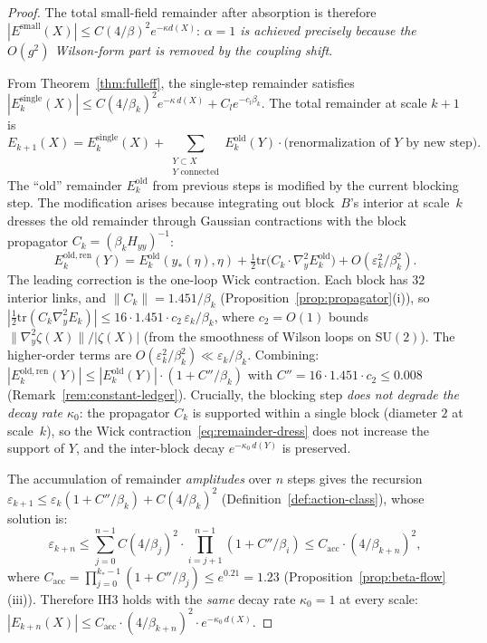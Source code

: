 \documentclass[11pt]{article}
\theoremstyle{definition}
\newcommand{\SU}{\mathrm{SU}}
\begin{document}
\begin{proof}
The total small-field remainder after absorption is therefore
$|E^{\mathrm{small}}(X)|\le C(4/\beta)^2 e^{-\kappa d(X)}$:
\emph{$\alpha=1$ is achieved precisely because the $O(g^2)$
Wilson-form part is removed by the coupling shift}.

From Theorem~\ref{thm:fulleff}, the single-step remainder satisfies
$|E_k^{\mathrm{single}}(X)|\le C(4/\beta_k)^2 e^{-\kappa\,d(X)}
+C_l e^{-c_l\beta_k}$.
The total remainder at scale $k+1$ is
\begin{equation}
E_{k+1}(X)=E_k^{\mathrm{single}}(X)
+\sum_{\substack{Y\subset X\\Y\text{ connected}}}
E_k^{\mathrm{old}}(Y)\cdot\text{(renormalization of $Y$ by new step)}.
\end{equation}
The ``old'' remainder $E_k^{\mathrm{old}}$ from previous steps is
modified by the current blocking step.  The modification arises
because integrating out block~$B$'s interior at scale~$k$ dresses
the old remainder through Gaussian contractions with the block
propagator $C_k=(\beta_k H_{yy})^{-1}$:
\begin{equation}\label{eq:remainder-dress}
E_k^{\mathrm{old,ren}}(Y)
=E_k^{\mathrm{old}}(y_*(\eta),\eta)
+\tfrac{1}{2}\mathrm{tr}\bigl(C_k\cdot\nabla_y^2 E_k^{\mathrm{old}}\bigr)
+O(\varepsilon_k^2/\beta_k^2).
\end{equation}
The leading correction is the one-loop Wick contraction.
Each block has $32$ interior links, and $\|C_k\|=1.451/\beta_k$
(Proposition~\ref{prop:propagator}(i)), so
$|\tfrac{1}{2}\mathrm{tr}(C_k\nabla_y^2 E_k)|
\le 16\cdot 1.451\cdot c_2\,\varepsilon_k/\beta_k$,
where $c_2=O(1)$ bounds $\|\nabla_y^2\zeta(X)\|/|\zeta(X)|$
(from the smoothness of Wilson loops on $\SU(2)$).
The higher-order terms are $O(\varepsilon_k^2/\beta_k^2)\ll
\varepsilon_k/\beta_k$.  Combining:
$|E_k^{\mathrm{old,ren}}(Y)|\le|E_k^{\mathrm{old}}(Y)|
\cdot(1+C''/\beta_k)$
with $C''=16\cdot 1.451\cdot c_2\le 0.008$
(Remark~\ref{rem:constant-ledger}).
Crucially, the blocking step \emph{does not degrade the
decay rate $\kappa_0$}: the propagator $C_k$ is supported
within a single block (diameter $2$ at scale~$k$), so the
Wick contraction~\eqref{eq:remainder-dress} does not increase
the support of $Y$, and the inter-block decay
$e^{-\kappa_0\,d(Y)}$ is preserved.

The accumulation of remainder \emph{amplitudes} over $n$ steps
gives the recursion
$\varepsilon_{k+1}\le\varepsilon_k(1+C''/\beta_k)+C(4/\beta_k)^2$
(Definition~\ref{def:action-class}),
whose solution is:
\begin{equation}\label{eq:Eacc}
\varepsilon_{k+n}
\le\sum_{j=0}^{n-1}
C(4/\beta_j)^2\cdot\prod_{i=j+1}^{n-1}(1+C''/\beta_i)
\le C_{\mathrm{acc}}\cdot(4/\beta_{k+n})^2,
\end{equation}
where $C_{\mathrm{acc}}=\prod_{j=0}^{k_*-1}(1+C''/\beta_j)
\le e^{0.21}=1.23$ (Proposition~\ref{prop:beta-flow}(iii)).
Therefore IH3 holds with the \emph{same} decay rate
$\kappa_0=1$ at every scale:
$|E_{k+n}(X)|\le C_{\mathrm{acc}}\cdot(4/\beta_{k+n})^2
\cdot e^{-\kappa_0\,d(X)}$.


\end{proof}
\end{document}
